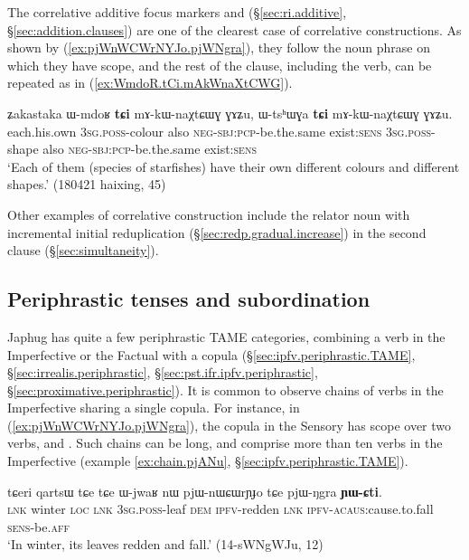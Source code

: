 The correlative additive focus markers  and  (§\ref{sec:ri.additive}, §\ref{sec:addition.clauses}) are one of the clearest case of correlative constructions. As shown by (\ref{ex:pjWnWCWrNYJo.pjWNgra}), they follow the noun phrase on which they have scope, and the rest of the clause, including the verb, can be repeated as in (\ref{ex:WmdoR.tCi.mAkWnaXtCWG}).


\begin{exe}
\ex \label{ex:WmdoR.tCi.mAkWnaXtCWG}
\gll ʑakastaka ɯ-mdoʁ \textbf{tɕi} mɤ-kɯ-naχtɕɯɣ ɣɤʑu, ɯ-tsʰɯɣa \textbf{tɕi} mɤ-kɯ-naχtɕɯɣ ɣɤʑu. \\
each.his.own \textsc{3sg}.\textsc{poss}-colour also \textsc{neg}-\textsc{sbj}:\textsc{pcp}-be.the.same exist:\textsc{sens} \textsc{3sg}.\textsc{poss}-shape also \textsc{neg}-\textsc{sbj}:\textsc{pcp}-be.the.same exist:\textsc{sens} \\
\glt `Each of them (species of starfishes) have their own different colours and different shapes.' (180421 haixing, 45)
\end{exe}

Other examples of correlative construction include the relator noun  with incremental initial reduplication (§\ref{sec:redp.gradual.increase}) in the second clause (§\ref{sec:simultaneity}).

\subsection{Periphrastic tenses and subordination}   \label{sec:periphrastic.subordination}
Japhug has quite a few periphrastic TAME categories, combining a verb in the Imperfective or the Factual with a copula (§\ref{sec:ipfv.periphrastic.TAME}, §\ref{sec:irrealis.periphrastic}, §\ref{sec:pst.ifr.ipfv.periphrastic}, §\ref{sec:proximative.periphrastic}). It is common to observe chains of verbs in the Imperfective sharing a single copula. For instance, in (\ref{ex:pjWnWCWrNYJo.pjWNgra}), the copula  in the Sensory has scope over two verbs,  and . Such chains can be long, and comprise more than ten verbs in the Imperfective (example \ref{ex:chain.pjANu}, §\ref{sec:ipfv.periphrastic.TAME}).


\begin{exe}
\ex \label{ex:pjWnWCWrNYJo.pjWNgra}
\gll tɕeri qartsɯ tɕe tɕe ɯ-jwaʁ nɯ pjɯ-nɯɕɯrɲɟo tɕe pjɯ-ŋgra \textbf{ɲɯ-ɕti}. \\
\textsc{lnk} winter \textsc{loc} \textsc{lnk} \textsc{3sg}.\textsc{poss}-leaf \textsc{dem} \textsc{ipfv}-redden \textsc{lnk} \textsc{ipfv}-\textsc{acaus}:cause.to.fall \textsc{sens}-be.\textsc{aff} \\
\glt `In winter, its leaves redden and fall.' (14-sWNgWJu, 12)
\end{exe}   

